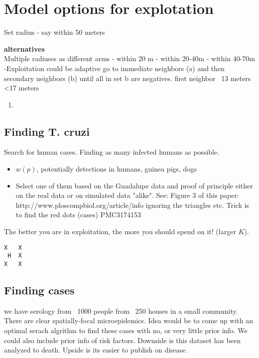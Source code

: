 \documentclass{article}
\begin{document}
\section{Model options for explotation}
Set radius
- say within 50 meters

{\bf alternatives} \\
Multiple radiuses as different arms 
- within 20 m
- within 20-40m
- within 40-70m
\\
-Exploitation could be adaptive
go to immediate neighbors (a) and then secondary neighbors (b) until all in set b are negatives.
first neighbor ~13 meters <17 meters

\begin{enumerate}
\item 
\end{enumerate}




\subsection{Finding T. cruzi}
Search for human cases.  Finding as many infected humans as possible.

\begin{itemize}
\item $w(p)$, potentially detections in humans, guinea pigs,  dogs
\item Select one of them based on the Guadalupe data and proof of principle
either on the real data or on simulated data "alike".
See: Figure 3 of this paper:
http://www.ploscompbiol.org/article/info%
ignoring the triangles etc. Trick is to find the red dots (cases) 
PMC3174153
\end{itemize}

The better you are in exploitation, the more you should spend on it! (larger $K$).
\begin{verbatim}
X   X
 H  X
X   X
\end{verbatim}


\subsection{Finding cases}
we have serology from ~1000 people from ~250 houses in a small community. There are clear spatially-focal microepidemics. Idea would be to come up with an optimal serach algrithm to find these cases with no, or very little prior info. We could also include prior info of risk factors. Downside is this dataset has been analyzed to death. Upside is its easier to publish on disease.
\end{document}
